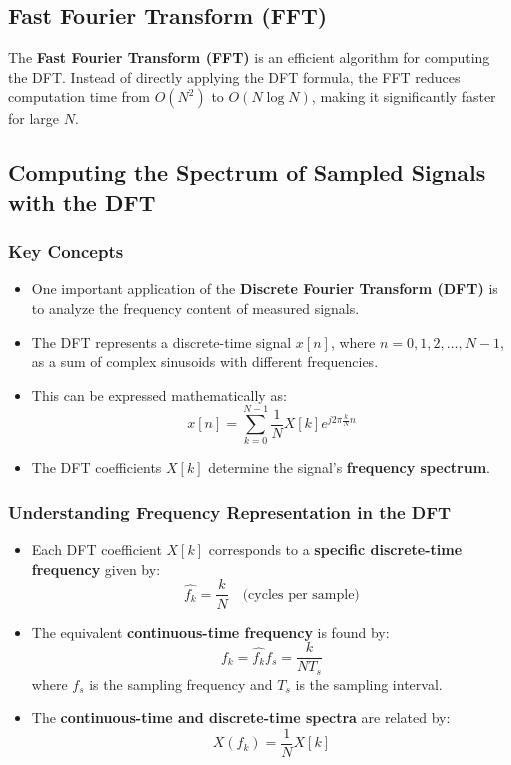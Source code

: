 \documentclass[12pt, letterpaper]{article}
\begin{document}
\subsection{Fast Fourier Transform (FFT)}
The \textbf{Fast Fourier Transform (FFT)} is an efficient algorithm for computing the DFT. Instead of directly applying the DFT formula, the FFT reduces computation time from \( O(N^2) \) to \( O(N \log N) \), making it significantly faster for large \( N \).

\subsection{Computing the Spectrum of Sampled Signals with the DFT}

\subsubsection*{Key Concepts}
\begin{itemize}
    \item One important application of the \textbf{Discrete Fourier Transform (DFT)} is to analyze the frequency content of measured signals.
    \item The DFT represents a discrete-time signal \( x[n] \), where \( n = 0, 1, 2, \dots, N-1 \), as a sum of complex sinusoids with different frequencies.
    \item This can be expressed mathematically as:
    \[
    x[n] = \sum_{k=0}^{N-1} \frac{1}{N} X[k] e^{j 2\pi \frac{k}{N} n}
    \]
    \item The DFT coefficients \( X[k] \) determine the signal’s \textbf{frequency spectrum}.
\end{itemize}

\subsubsection*{Understanding Frequency Representation in the DFT}
\begin{itemize}
    \item Each DFT coefficient \( X[k] \) corresponds to a \textbf{specific discrete-time frequency} given by:
    \[
    \hat{f_k} = \frac{k}{N} \quad \text{(cycles per sample)}
    \]
    \item The equivalent \textbf{continuous-time frequency} is found by:
    \[
    f_k = \hat{f_k} f_s = \frac{k}{N T_s}
    \]
    where \( f_s \) is the sampling frequency and \( T_s \) is the sampling interval.
    \item The \textbf{continuous-time and discrete-time spectra} are related by:
    \[
    X(f_k) = \frac{1}{N} X[k]
    \]
\end{itemize}
\end{document}
